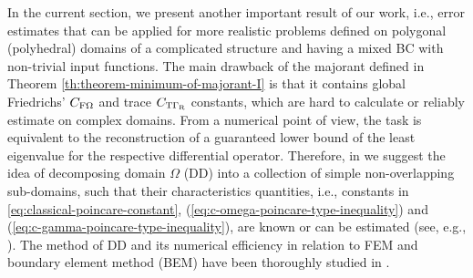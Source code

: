 In the current section, we present another important result of our work, i.e., 
error estimates that can be applied for more realistic problems defined on polygonal 
(polyhedral) domains of a complicated structure and having a mixed BC with non-trivial input 
functions. 
The main drawback of the majorant defined in Theorem \ref{th:theorem-minimum-of-majorant-I} 
is that it contains global Friedrichs' $C_{{\rm F}\Omega}$ and trace $C_{{\rm T} \Gamma_{\rm R}}$ 
constants, which are hard to calculate or reliably estimate on complex domains. 
From a numerical point of view, 
the task is equivalent to the reconstruction of a guaranteed lower bound of the least 
eigenvalue for the respective differential operator. Therefore, in 
\cite{RefMatculevichNeitaanmakiRepin2015, RefMatculevichRepinPoincare2014} we suggest
the idea of decomposing domain $\Omega$ (DD) into a collection of simple non-overlapping 
sub-domains,
such that their characteristics quantities, i.e., constants in 
\eqref{eq:classical-poincare-constant}, 
(\ref{eq:c-omega-poincare-type-inequality}) 
and (\ref{eq:c-gamma-poincare-type-inequality}), are known or can be estimated 
(see, e.g., \cite{NazarovRepin2014, Pinsky1980, HoshikawaUrakawa2010,KikuchiLiu2007,RefArxivMatculevichRepin2015}). The method of DD and  
its numerical efficiency in relation to FEM and boundary element method (BEM) have been 
thoroughly studied in \cite{Langer1994, CarstensenKuhnLanger1998, HaaseHeiseKuhnLanger1997}.

